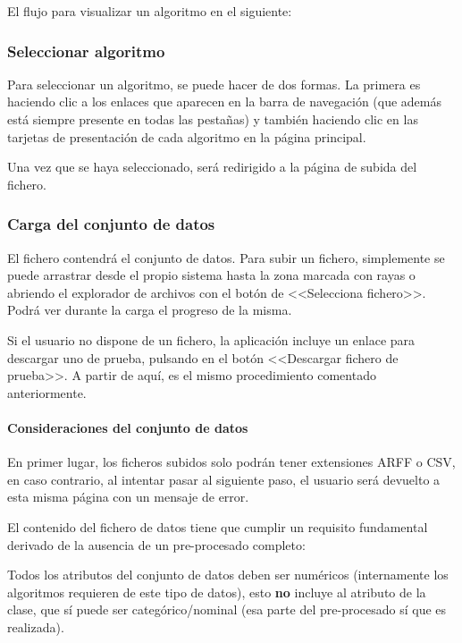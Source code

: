 El flujo para visualizar un algoritmo en el siguiente:


\subsubsection{Seleccionar algoritmo}
Para seleccionar un algoritmo, se puede hacer de dos formas. La primera es
haciendo clic a los enlaces que aparecen en la barra de navegación (que además
está siempre presente en todas las pestañas) y también haciendo clic en las
tarjetas de presentación de cada algoritmo en la página principal.

Una vez que se haya seleccionado, será redirigido a la página de subida del
fichero. 

\subsubsection{Carga del conjunto de datos}

El fichero contendrá el conjunto de datos. Para subir un fichero, simplemente se
puede arrastrar desde el propio sistema hasta la zona marcada con rayas o
abriendo el explorador de archivos con el botón de <<Selecciona fichero>>. Podrá
ver durante la carga el progreso de la misma.

Si el usuario no dispone de un fichero, la aplicación incluye un enlace para
descargar uno de prueba, pulsando en el botón <<Descargar fichero de prueba>>. A
partir de aquí, es el mismo procedimiento comentado anteriormente.


\paragraph{Consideraciones del conjunto de datos} En primer lugar, los ficheros
subidos solo podrán tener extensiones ARFF o CSV, en caso contrario, al intentar
pasar al siguiente paso, el usuario será devuelto a esta misma página con un
mensaje de error.

El contenido del fichero de datos tiene que cumplir un requisito fundamental
derivado de la ausencia de un pre-procesado completo: 

\begin{tcolorbox}[colback=red!5!white,colframe=red!75!black,fontupper=\footnotesize,title=Requisito fundamental]
Todos los atributos del conjunto de datos deben ser numéricos (internamente los
algoritmos requieren de este tipo de datos), esto \textbf{no} incluye al
atributo de la clase, que sí puede ser categórico/nominal (esa parte del
pre-procesado sí que es realizada).
\end{tcolorbox}

